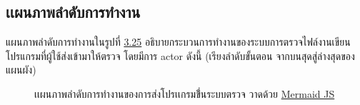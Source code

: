 \documentclass[12pt,one side,openright,a4paper]{cpe-thesis-th}
\newcommand{\thaijustify}[1]{%
  \par\hspace{30pt}\justifying
  #1
}
\begin{document}
    \subsection{เเผนภาพลำดับการทำงาน}
        \thaijustify{
            แผนภาพลำดับการทำงานในรูปที่ \hyperlink{comp-diagram}{3.25} อธิบายกระบวนการทำงานของระบบการตรวจไฟล์งานเขียนโปรแกรมที่ผู้ใช้ส่งเข้ามาให้ตรวจ โดยมีการ actor ดังนี้ (เรียงลำดับขั้นตอน จากบนสุดสู่ล่างสุดของแผนผัง)
        }
         \hypertarget{seq-diagram1}{
                \begin{figure}[!h]
                \centering
                    \caption[ภาพเเผนภาพลำดับการทำงาน]{เเผนภาพลำดับการทำงานของการส่งโปรเเกรมขึ่้นระบบตรวจ วาดด้วย \href{https://mermaid.js.org/}{Mermaid JS}}
                    \label{fig:seq-diagram1}
                \end{figure}
            }
\end{document}
